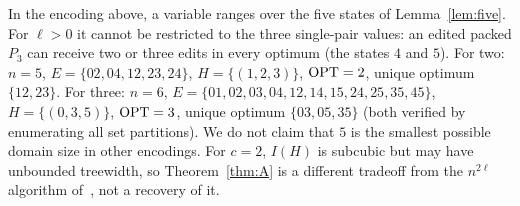 \begin{remark}\label{rem:domain}
In the encoding above, a variable ranges over the five states of Lemma~\ref{lem:five}. For $\ell>0$ it cannot be restricted to the three single-pair values: an edited packed $P_3$ can receive two or three edits in every optimum (the states $4$ and $5$). For two: $n=5$, $E=\{02,04,12,23,24\}$, $H=\{(1,2,3)\}$, $\mathrm{OPT}=2$, unique optimum $\{12,23\}$. For three: $n=6$, $E=\{01,02,03,04,12,14,15,24,25,35,45\}$, $H=\{(0,3,5)\}$, $\mathrm{OPT}=3$, unique optimum $\{03,05,35\}$ (both verified by enumerating all set partitions). We do not claim that $5$ is the smallest possible domain size in other encodings. For $c=2$, $I(H)$ is subcubic but may have unbounded treewidth, so Theorem~\ref{thm:A} is a different tradeoff from the $n^{2\ell}$ algorithm of~\cite{LPS23}, not a recovery of it.
\end{remark}
